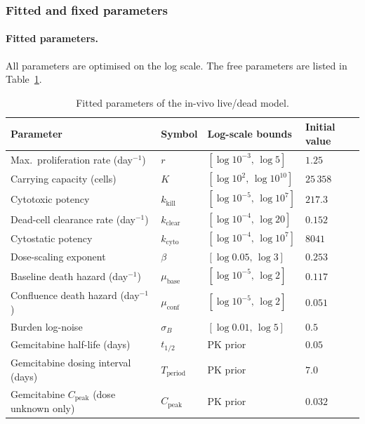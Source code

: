 \documentclass[11pt,notitlepage]{article}
\begin{document}
\subsubsection{Fitted and fixed parameters}
\label{sec:invivo_params}

\paragraph{Fitted parameters.}
All parameters are optimised on the log scale.
The free parameters are listed in Table~\ref{tab:invivo_params_new}.

\begin{table}[h!]
\centering
\caption{Fitted parameters of the in-vivo live/dead model.}
\label{tab:invivo_params_new}
\begin{tabular}{llll}
\hline
Parameter & Symbol & Log-scale bounds & Initial value \\
\hline
Max.\ proliferation rate (day$^{-1}$) & $r$ &
  $[\log 10^{-3},\,\log 5]$ & $1.25$ \\
Carrying capacity (cells) & $K$ &
  $[\log 10^{2},\,\log 10^{10}]$ & $25\,358$ \\
Cytotoxic potency & $k_{\mathrm{kill}}$ &
  $[\log 10^{-5},\,\log 10^{7}]$ & $217.3$ \\
Dead-cell clearance rate (day$^{-1}$) & $k_{\mathrm{clear}}$ &
  $[\log 10^{-4},\,\log 20]$ & $0.152$ \\
Cytostatic potency & $k_{\mathrm{cyto}}$ &
  $[\log 10^{-4},\,\log 10^{7}]$ & $8041$ \\
Dose-scaling exponent & $\beta$ &
  $[\log 0.05,\,\log 3]$ & $0.253$ \\
Baseline death hazard (day$^{-1}$) & $\mu_{\mathrm{base}}$ &
  $[\log 10^{-5},\,\log 2]$ & $0.117$ \\
Confluence death hazard (day$^{-1}$) & $\mu_{\mathrm{conf}}$ &
  $[\log 10^{-5},\,\log 2]$ & $0.051$ \\
Burden log-noise & $\sigma_B$ &
  $[\log 0.01,\,\log 5]$ & $0.5$ \\
Gemcitabine half-life (days) & $t_{1/2}$ & PK prior & $0.05$ \\
Gemcitabine dosing interval (days) & $T_{\mathrm{period}}$ & PK prior & $7.0$ \\
Gemcitabine $C_{\mathrm{peak}}$ (dose unknown only) & $C_{\mathrm{peak}}$ & PK prior & $0.032$ \\
\hline
\end{tabular}
\end{table}
\end{document}

